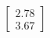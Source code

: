 \documentclass[preview]{standalone}
\begin{document}
\begin{align*}
\begin{bmatrix} 2.78 \\ 3.67 \end{bmatrix}
\end{align*}
\end{document}
